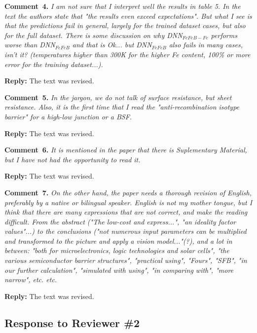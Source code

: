 \documentclass[num-refs]{wiley-article} %
\begin{document}
\textcolor[rgb]{0.00,0.50,1.00}{\textbf{Comment~4.}}
\emph{I am not sure that I interpret well the results in table 5.
In the text the authors state that "the results even exceed expectations".
But what I see is that the predictions fail in general, largely for the trained dataset cases, but also for the full dataset.
There is some discussion on why DNN$_{FeFeB-Fe}$ performs worse than DNN$_{FeFeB}$ and that is Ok... but DNN$_{FeFeB}$ also fails in many cases, isn't it?
(temperatures higher than 300K for the higher Fe content, 100\% or more error for the training dataset...).
}

\noindent
\textcolor[rgb]{0.51,0.00,0.00}{\textbf{Reply:}}
The text was revised.


\textcolor[rgb]{0.00,0.50,1.00}{\textbf{Comment~5.}}
\emph{In the jargon, we do not talk of surface resistance, but sheet resistance.
Also, it is the first time that I read the "anti-recombination isotype barrier" for a high-low junction or a BSF.}

\noindent
\textcolor[rgb]{0.51,0.00,0.00}{\textbf{Reply:}}
The text was revised.

\textcolor[rgb]{0.00,0.50,1.00}{\textbf{Comment~6.}}
\emph{It is mentioned in the paper that there is Suplementary Material, but I have not had the opportunity to read it.}

\noindent
\textcolor[rgb]{0.51,0.00,0.00}{\textbf{Reply:}}
The text was revised.

\textcolor[rgb]{0.00,0.50,1.00}{\textbf{Comment~7.}}
\emph{On the other hand, the paper needs a thorough revision of English, preferably by a native or bilingual speaker.
English is not my mother tongue, but I think that there are many expressions that are not correct, and make the reading difficult.
From the abstract ("The low-cost and express...", "an ideality factor values"...)
to the conclusions ("not numerous input parameters can be multiplied and transformed to the picture and apply a vision model..."(?),
and a lot in between: "both for microelectronics, logic technologies and solar cells",
"the various semiconductor barrier structures", "practical using", "Fours", "SFB", "in our further calculation",
"simulated with using", "in comparing with", "more narrow", etc. etc. }

\noindent
\textcolor[rgb]{0.51,0.00,0.00}{\textbf{Reply:}}
The text was revised.




\subsection*{Response to Reviewer \#2 }
\end{document}
